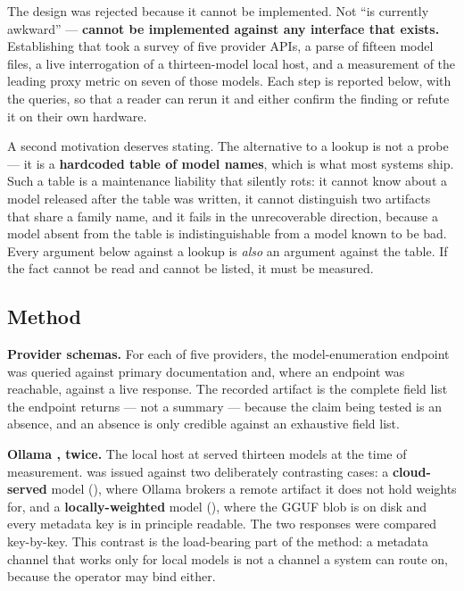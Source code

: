 The design was rejected because it cannot be implemented. Not ``is currently
awkward'' --- \textbf{cannot be implemented against any interface that exists.}
Establishing that took a survey of five provider APIs, a parse of fifteen model
files, a live interrogation of a thirteen-model local host, and a measurement of
the leading proxy metric on seven of those models. Each step is reported below,
with the queries, so that a reader can rerun it and either confirm the finding
or refute it on their own hardware.

A second motivation deserves stating. The alternative to a lookup is not a probe
--- it is a \textbf{hardcoded table of model names}, which is what most systems
ship. Such a table is a maintenance liability that silently rots: it cannot know
about a model released after the table was written, it cannot distinguish two
artifacts that share a family name, and it fails in the unrecoverable direction,
because a model absent from the table is indistinguishable from a model known to
be bad. Every argument below against a lookup is \emph{also} an argument against
the table. If the fact cannot be read and cannot be listed, it must be measured.

\subsection{Method}
\label{sec:appendix-method}

\textbf{Provider schemas.} For each of five providers, the model-enumeration
endpoint was queried against primary documentation and, where an endpoint was
reachable, against a live response. The recorded artifact is the complete field
list the endpoint returns --- not a summary --- because the claim being tested
is an absence, and an absence is only credible against an exhaustive field list.

\textbf{Ollama , twice.} The local host at
 served thirteen models at the time of measurement.
 was issued against two deliberately contrasting cases: a
\textbf{cloud-served} model (), where Ollama brokers a remote
artifact it does not hold weights for, and a \textbf{locally-weighted} model
(), where the GGUF blob is on disk and every metadata key is in
principle readable. The two responses were compared key-by-key. This contrast is
the load-bearing part of the method: a metadata channel that works only for local
models is not a channel a system can route on, because the operator may bind
either.

